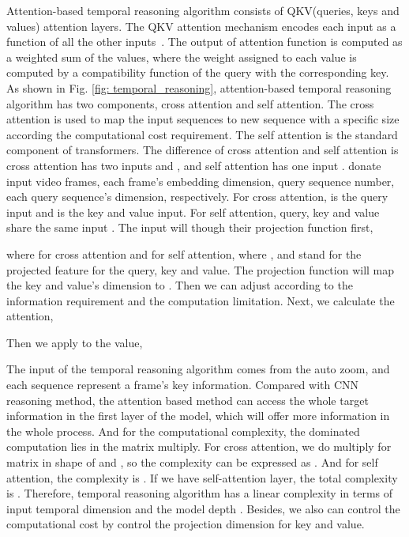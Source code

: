\documentclass[letterpaper, 10 pt, conference]{ieeeconf}
\begin{document}
Attention-based temporal reasoning algorithm consists of QKV(queries, keys and values) attention layers. The QKV attention mechanism encodes each input as a function of all the other inputs~\cite{vaswani2017attention,jaegle2021perceiver}. The output of attention function is computed as a weighted sum of the values, where the weight assigned to each value is computed by a compatibility function of the query with the corresponding key\cite{vaswani2017attention}. As shown in Fig. \ref{fig: temporal_reasoning}, attention-based temporal reasoning algorithm has two components, cross attention and self attention. The cross attention is used to map the input sequences to new sequence with a specific size according the computational cost requirement. The self attention is the standard component of transformers\cite{vaswani2017attention}. The difference of cross attention and self attention is cross attention has two inputs  and , and self attention has one input .  donate input video frames, each frame's embedding dimension, query sequence number, each query sequence's dimension, respectively. For cross attention,  is the query input and  is the key and value input. For self attention, query, key and value share the same input .  The input will though their projection function  first,

where  for cross attention and  for self attention, where , and  stand for the projected feature for the query, key and value. The projection function will map the key and value's dimension to . Then we can adjust  according to the information requirement and the computation limitation. Next, we calculate the attention,

Then we apply to the value,

The input of the temporal reasoning algorithm comes from the auto zoom, and each sequence represent a frame's key information. Compared with CNN reasoning method, the attention based method can access the whole target information in the first layer of the model, which will offer more information in the whole process. And for the computational complexity, the dominated computation lies in the matrix multiply. For cross attention, we do multiply for matrix in shape of  and , so the complexity can be expressed as . And for self attention, the complexity is . If we have  self-attention layer, the total complexity is . Therefore, temporal reasoning algorithm has a linear complexity in terms of input temporal dimension  and the model depth . Besides, we also can control the computational cost by control the projection dimension  for key and value.
\end{document}
